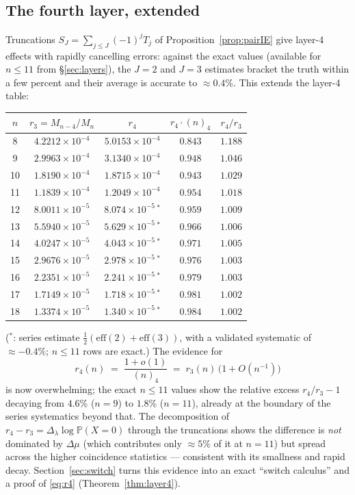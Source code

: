 \documentclass[11pt]{article}
\theoremstyle{definition}
\renewcommand{\Pr}{\mathbb{P}}
\begin{document}
\subsection{The fourth layer, extended}

Truncations $S_J=\sum_{j\le J}(-1)^jT_j$ of Proposition~\ref{prop:pairIE}
give layer-4 effects with rapidly cancelling errors: against the exact
values (available for $n\le11$ from \S\ref{sec:layers}), the $J=2$ and
$J=3$ estimates bracket the truth within a few percent and their average is
accurate to $\approx0.4\%$.  This extends the layer-4 table:

\begin{center}
\small
\begin{tabular}{c c c c c}
\toprule
$n$ & $r_3=M_{n-4}/M_n$ & $r_4$ & $r_4\cdot(n)_4$ & $r_4/r_3$\\
\midrule
8  & $4.2212\times10^{-4}$ & $5.0153\times10^{-4}$ & $0.843$ & $1.188$\\
9  & $2.9963\times10^{-4}$ & $3.1340\times10^{-4}$ & $0.948$ & $1.046$\\
10 & $1.8190\times10^{-4}$ & $1.8715\times10^{-4}$ & $0.943$ & $1.029$\\
11 & $1.1839\times10^{-4}$ & $1.2049\times10^{-4}$ & $0.954$ & $1.018$\\
12 & $8.0011\times10^{-5}$ & $8.074\times10^{-5}\,^*$ & $0.959$ & $1.009$\\
13 & $5.5940\times10^{-5}$ & $5.629\times10^{-5}\,^*$ & $0.966$ & $1.006$\\
14 & $4.0247\times10^{-5}$ & $4.043\times10^{-5}\,^*$ & $0.971$ & $1.005$\\
15 & $2.9676\times10^{-5}$ & $2.978\times10^{-5}\,^*$ & $0.976$ & $1.003$\\
16 & $2.2351\times10^{-5}$ & $2.241\times10^{-5}\,^*$ & $0.979$ & $1.003$\\
17 & $1.7149\times10^{-5}$ & $1.718\times10^{-5}\,^*$ & $0.981$ & $1.002$\\
18 & $1.3374\times10^{-5}$ & $1.340\times10^{-5}\,^*$ & $0.984$ & $1.002$\\
\bottomrule
\end{tabular}
\end{center}

\noindent
($^*$: series estimate $\tfrac12(\mathrm{eff}(2)+\mathrm{eff}(3))$, with a
validated systematic of $\approx-0.4\%$; $n\le11$ rows are exact.)  The
evidence for
\begin{equation}\label{eq:r4}
r_4(n)\;=\;\frac{1+o(1)}{(n)_4}\;=\;r_3(n)\,\bigl(1+O(n^{-1})\bigr)
\end{equation}
is now overwhelming; the exact $n\le11$ values show the relative excess
$r_4/r_3-1$ decaying from $4.6\%$ ($n=9$) to $1.8\%$ ($n=11$), already at
the boundary of the series systematics beyond that.  The decomposition of
$r_4-r_3=\Delta_\lambda\log\Pr(X=0)$ through the truncations shows the
difference is \emph{not} dominated by $\Delta\mu$ (which contributes only
$\approx5\%$ of it at $n=11$) but spread across the higher coincidence
statistics --- consistent with its smallness and rapid decay.
Section~\ref{sec:switch} turns this evidence into an exact ``switch
calculus'' and a proof of \eqref{eq:r4} (Theorem~\ref{thm:layer4}).
\end{document}
